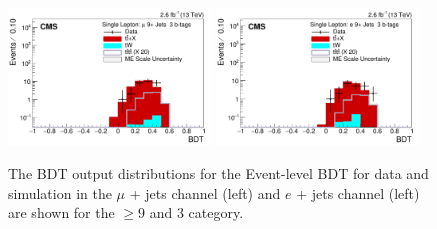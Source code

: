 \begin{figure}[ht!]
    \includegraphics[width=0.48\textwidth]{images/Run2/BDT_Mu29Aug400trees_5MinNodeSize_20nCuts_3MaxDepth_5adaboostbeta_adaBoost_alphaSTune_noMinEvents9nJets3nMtags_StackLogY.pdf}
    \includegraphics[width=0.48\textwidth]{images/Run2/BDT_El29Aug400trees_5MinNodeSize_20nCuts_3MaxDepth_5adaboostbeta_adaBoost_alphaSTune_noMinEvents9nJets3nMtags_StackLogY.pdf}
    \caption{The BDT output distributions for the Event-level BDT for data and simulation in the $\mu$ + jets channel (left) and $e$ + jets channel (left) are shown for the $\geq9$ \njets  and 3 \nMtags category.}
    \label{fig:BDT_Mu29Aug400trees_5MinNodeSize_20nCuts_3MaxDepth_5adaboostbeta_adaBoost_alphaSTune_noMinEvents93}
\end{figure}

